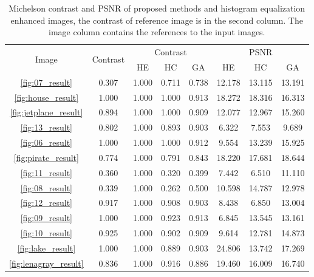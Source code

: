 \begin{table}[t]
    \centering
    \begin{tabular}{|c|c|c|c|c|c|c|c|}
        \hline
        \multirow{2}{6mm}{Image} & \multirow{2}{8mm}{Contrast} & \multicolumn{3}{|c|}{Contrast} & \multicolumn{3}{|c|}{PSNR} \\
        \cline{3-8}
         & & HE & HC & GA & HE & HC & GA \\
        \hline
          \ref{fig:07_result} & 0.307 & 1.000 & 0.711 & 0.738 & 12.178 & 13.115 & 13.191 \\
        \hline
          \ref{fig:house_result} & 1.000 & 1.000 & 1.000 & 0.913 & 18.272 & 18.316 & 16.313 \\
        \hline
          \ref{fig:jetplane_result} & 0.894 & 1.000 & 1.000 & 0.909 & 12.077 & 12.967 & 15.260 \\
        \hline
          \ref{fig:13_result} & 0.802 & 1.000 & 0.893 & 0.903 & 6.322 & 7.553 & 9.689 \\
        \hline
          \ref{fig:06_result} & 1.000 & 1.000 & 1.000 & 0.912 & 9.554 & 13.239 & 15.925 \\
        \hline
          \ref{fig:pirate_result} & 0.774 & 1.000 & 0.791 & 0.843 & 18.220 & 17.681 & 18.644 \\
        \hline
          \ref{fig:11_result} & 0.360 & 1.000 & 0.320 & 0.399 & 7.442 & 6.510 & 11.110 \\
        \hline
        \ref{fig:08_result} & 0.339 & 1.000 & 0.262 & 0.500 & 10.598 & 14.787 & 12.978 \\
        \hline
          \ref{fig:12_result} & 0.917 & 1.000 & 0.908 & 0.903 & 8.438 & 6.850 & 13.004 \\
        \hline
        \ref{fig:09_result} & 1.000 & 1.000 & 0.923 & 0.913 & 6.845 & 13.545 & 13.161 \\
        \hline
          \ref{fig:10_result} & 0.925 & 1.000 & 0.902 & 0.909 & 9.614 & 12.781 & 14.873 \\
        \hline
          \ref{fig:lake_result} & 1.000 & 1.000 & 0.889 & 0.903 & 24.806 & 13.742 & 17.269 \\
        \hline
          \ref{fig:lenagray_result} & 0.836 & 1.000 & 0.916 & 0.886 & 19.460 & 16.009 & 16.740 \\
        \hline
        \end{tabular}
    \caption{Michelson contrast and PSNR of proposed methods and histogram equalization enhanced images, the contrast of reference image is in the second column. The image column contains the references to the input images.}
    \label{tab:image_metrics}
\end{table}